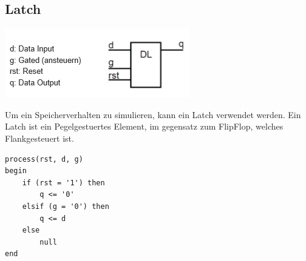 \subsection{Latch}
\begin{center}
	\includegraphics[width=0.5\columnwidth]{Images/latch}
\end{center}
Um ein Speicherverhalten zu simulieren, kann ein Latch verwendet werden. Ein Latch ist ein Pegelgestuertes Element, im gegensatz zum FlipFlop, welches Flankgesteuert ist.
\begin{lstlisting}
process(rst, d, g)
begin
	if (rst = '1') then
		q <= '0' 
	elsif (g = '0') then
		q <= d
	else 
		null
end
\end{lstlisting}